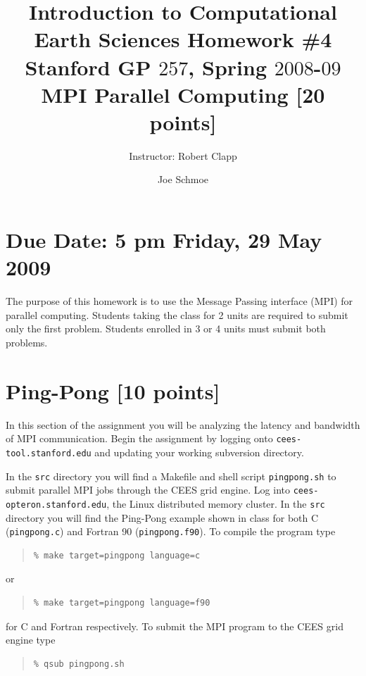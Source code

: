\renewcommand{\labelenumi}{(\alph{enumi})}

\title{Introduction to Computational Earth Sciences Homework \#4 \\
 Stanford GP $257$, Spring $2008$-$09$ }
\lefthead{}
\righthead{}
\footer{}

\author{Instructor: Robert Clapp}

\section{Due Date: 5 pm Friday, 29 May 2009}

\title{MPI Parallel Computing [20 points]}
The purpose of this homework is to use the Message Passing interface (MPI) for parallel computing. Students taking the class for 2 units are required to submit only the first problem. Students enrolled in 3 or 4 units must submit both problems.
\author{Joe Schmoe}
\section{Ping-Pong [10 points]}
In this section of the assignment you will be analyzing the latency and bandwidth of MPI communication. 
Begin the assignment by logging onto \texttt{cees-tool.stanford.edu} and updating
your working subversion directory.

In the \texttt{src} directory you will find a Makefile and shell script \texttt{pingpong.sh} to submit parallel MPI jobs through the CEES grid engine. Log into \texttt{cees-opteron.stanford.edu}, the Linux distributed memory cluster. In the \texttt{src} directory you will find the Ping-Pong example shown in class for both C (\texttt{pingpong.c}) and Fortran 90 (\texttt{pingpong.f90}). To compile the program type 
\begin{quote}
\begin{verbatim}
% make target=pingpong language=c
\end{verbatim}
\end{quote}
or
\begin{quote}
\begin{verbatim}
% make target=pingpong language=f90
\end{verbatim}
\end{quote}
for C and Fortran respectively. To submit the MPI program to the CEES grid engine type
\begin{quote}
\begin{verbatim}
% qsub pingpong.sh
\end{verbatim}
\end{quote}

